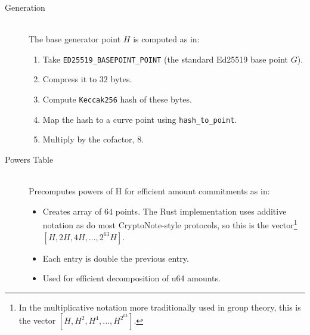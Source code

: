 \documentclass[12pt,a4paper]{article}
\begin{document}
\begin{description}
\item[Generation] \hfill \\
The base generator point $H$ is computed as in:
\begin{enumerate}
\item Take \texttt{ED25519\_BASEPOINT\_POINT} (the standard Ed25519 base point $G$).  %
\item Compress it to $32$ bytes.  %
\item Compute \texttt{Keccak256} hash of these bytes.  %
\item Map the hash to a curve point using \texttt{hash\_to\_point}.  %
\item Multiply by the cofactor, $8$.  %
\end{enumerate}

\item[Powers Table] \hfill \\
Precomputes powers of H for efficient amount commitments as in:
\begin{itemize}
\item Creates array of $64$ points. The Rust implementation uses additive notation as do most CryptoNote-style protocols, so this is the vector\footnote{In the multiplicative notation more traditionally used in group theory, this is the vector $[H, H^{2}, H^{4}, ..., H^{2^{63}}]$.} $[H, 2H, 4H, \ldots, 2^{63}H]$.   %
\item Each entry is double the previous entry.  %
\item Used for efficient decomposition of u64 amounts.  %
\end{itemize}
\end{description}
\end{document}
